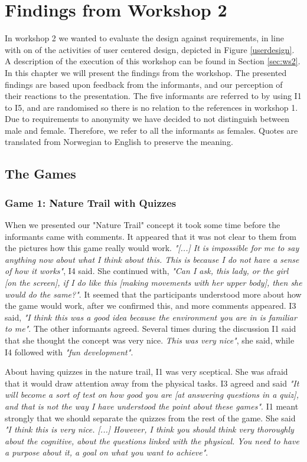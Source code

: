 \chapter{Findings from Workshop 2}
\label{chap:findW2}

In workshop 2 we wanted to evaluate the design against requirements, in line with on of the activities of user centered design, depicted in Figure \ref{userdesign}. A description of the execution of this workshop can be found in Section \ref{sec:ws2}. In this chapter we will present the findings from the workshop. The presented findings are based upon feedback from the informants, and our perception of their reactions to the presentation. The five informants are referred to by using I1 to I5, and are randomised so there is no relation to the references in workshop 1. Due to requirements to anonymity we have decided to not distinguish between male and female. Therefore, we refer to all the informants as females.  Quotes are translated from Norwegian to English to  preserve the meaning. 

\section{The Games}

\subsection{Game 1: Nature Trail with Quizzes}

When we presented our "Nature Trail" concept it took some time before the informants came with comments. It appeared that it was not clear to them from the pictures how this game really would work. \emph{"[...] It is impossible for me to say anything now about what I think about this. This is because I do not have a sense of how it works"}, I4 said. She continued with, \emph{"Can I ask, this lady, or the girl [on the screen], if I do like this [making movements with her upper body], then she would do the same?"}.  It seemed that the participants understood more about how the game would work, after we confirmed this, and more comments appeared. I3 said, \emph{"I think this was a good idea because the environment you are in is familiar to me"}. The other informants agreed. Several times during the discussion I1 said that she thought the concept was very nice. \emph{This was very nice"}, she said, while I4 followed with \emph{"fun development"}.  

About having quizzes in the nature trail, I1 was very sceptical. She was afraid that it would draw attention away from the physical tasks. I3 agreed and said \emph{"It will become a sort of test on how good you are [at answering questions in a quiz], and that is not the way I have understood the point about these games"}. I1 meant strongly that we should separate the quizzes from the rest of the game. She said \emph{"I think this is very nice. [...] However, I think you should think very thoroughly about the cognitive, about the questions linked with the physical. You need to have a purpose about it, a goal on what you want to achieve"}. 

